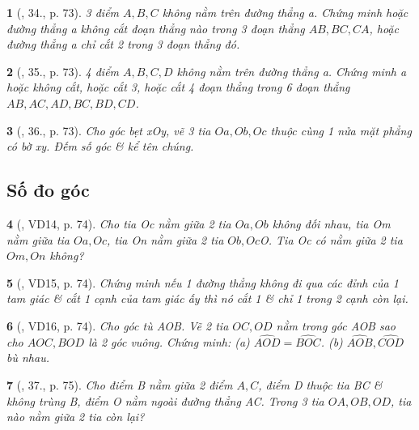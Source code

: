 \documentclass{article}
\newtheorem{baitoan}{}
\begin{document}
\begin{baitoan}[\cite{Binh_Toan_6_tap_2}, 34., p. 73]
	3 điểm $A,B,C$ không nằm trên đường thẳng a. Chứng minh hoặc đường thẳng a không cắt đoạn thẳng nào trong 3 đoạn thẳng $AB,BC,CA$, hoặc đường thẳng a chỉ cắt 2 trong 3 đoạn thẳng đó.
\end{baitoan}

\begin{baitoan}[\cite{Binh_Toan_6_tap_2}, 35., p. 73]
	4 điểm $A,B,C,D$ không nằm trên đường thẳng a. Chứng minh a hoặc không cắt, hoặc cắt 3, hoặc cắt 4 đoạn thẳng trong 6 đoạn thẳng $AB,AC,AD,BC,BD,CD$.
\end{baitoan}

\begin{baitoan}[\cite{Binh_Toan_6_tap_2}, 36., p. 73]
	Cho góc bẹt xOy, vẽ 3 tia $Oa,Ob,Oc$ thuộc cùng 1 nửa mặt phẳng có bờ xy. Đếm số góc \& kể tên chúng.
\end{baitoan}


\subsection{Số đo góc}

\begin{baitoan}[\cite{Binh_Toan_6_tap_2}, VD14, p. 74]
	Cho tia Oc nằm giữa 2 tia $Oa,Ob$ không đối nhau, tia Om nằm giữa tia $Oa,Oc$, tia On nằm giữa 2 tia $Ob,Oc$O. Tia Oc có nằm giữa 2 tia $Om,On$ không?
\end{baitoan}

\begin{baitoan}[\cite{Binh_Toan_6_tap_2}, VD15, p. 74]
	Chứng minh nếu 1 đường thẳng không đi qua các đỉnh của 1 tam giác \& cắt 1 cạnh của tam giác ấy thì nó cắt 1 \& chỉ 1 trong 2 cạnh còn lại.
\end{baitoan}

\begin{baitoan}[\cite{Binh_Toan_6_tap_2}, VD16, p. 74]
	Cho góc tù AOB. Vẽ 2 tia $OC,OD$ nằm trong góc AOB sao cho $AOC,BOD$ là 2 góc vuông. Chứng minh: (a) $\widehat{AOD} = \widehat{BOC}$. (b) $\widehat{AOB},\widehat{COD}$ bù nhau.
\end{baitoan}

\begin{baitoan}[\cite{Binh_Toan_6_tap_2}, 37., p. 75]
	Cho điểm B nằm giữa 2 điểm $A,C$, điểm D thuộc tia BC \& không trùng B, điểm O nằm ngoài đường thẳng AC. Trong 3 tia $OA,OB,OD$, tia nào nằm giữa 2 tia còn lại?
\end{baitoan}
\end{document}
